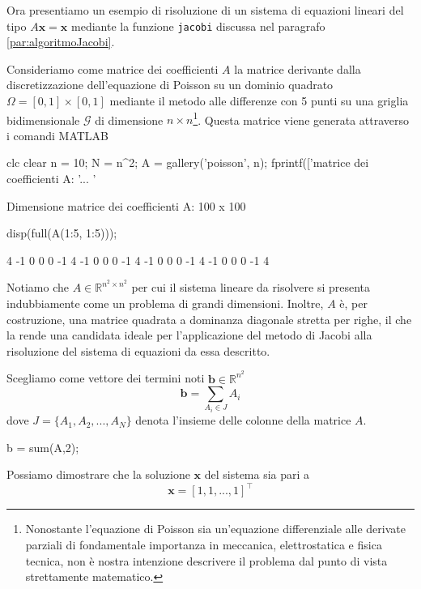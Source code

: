 \nocite{MathWorksIterativeMethods}
Ora presentiamo un esempio di risoluzione di un sistema di equazioni lineari del tipo $A\mathbf{x}=\mathbf{x}$ mediante la funzione 
\lstinline{jacobi} discussa nel paragrafo \ref{par:algoritmoJacobi}.

Consideriamo come matrice dei coefficienti $A$ la matrice derivante dalla discretizzazione dell'equazione di Poisson su un 
dominio quadrato $\Omega=[0, 1]\times[0, 1]$ mediante il metodo alle differenze con 5 punti su una griglia bidimensionale $\mathcal{G}$ di dimensione $n\times n$\footnote{
Nonostante l'equazione di Poisson sia un'equazione differenziale alle derivate parziali di fondamentale importanza in meccanica, 
elettrostatica e fisica tecnica, non \`e nostra intenzione descrivere il problema dal punto di vista strettamente matematico.}.\newline
Questa matrice viene generata attraverso i comandi MATLAB
\begin{matlabcode}
clc
clear
n = 10;
N = n^2;
A = gallery('poisson', n);
fprintf(['\nDimensione matrice dei coefficienti A: '...
       '%
\end{matlabcode}
\begin{matlaboutput}
Dimensione matrice dei coefficienti A: 100 x 100 
\end{matlaboutput}
\begin{matlabcode}
disp(full(A(1:5, 1:5)));
\end{matlabcode}
\begin{matlaboutput}
     4    -1     0     0     0
    -1     4    -1     0     0
     0    -1     4    -1     0
     0     0    -1     4    -1
     0     0     0    -1     4
\end{matlaboutput}
Notiamo che $A\in\mathbb{R}^{n^{2} \times n^{2}}$ per cui il sistema lineare da risolvere si presenta indubbiamente 
come un problema di grandi dimensioni.\newline
Inoltre, $A$ \`e, per costruzione, una matrice quadrata a dominanza diagonale stretta per righe, il che la rende una candidata 
ideale per l'applicazione del metodo di Jacobi alla risoluzione del sistema di equazioni da essa descritto.

Scegliamo come vettore dei termini noti $\mathbf{b}\in\mathbb{R}^{{n}^{2}}$ 
\begin{equation*}
\mathbf{b} = \sum_ {A_{i} \in J} A_{i}
\end{equation*}
dove $J = \{A_{1}, A_{2}, ..., A_{N}\}$ denota l'insieme delle colonne della matrice $A$.
\begin{matlabcode}
b = sum(A,2);
\end{matlabcode}
Possiamo dimostrare che la soluzione $\mathbf{x}$ del sistema sia pari a 
\begin{equation*}
\mathbf{x} = [1, 1, ..., 1]^\top
\end{equation*}
